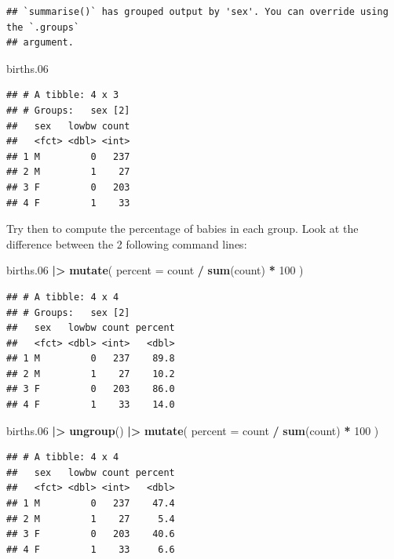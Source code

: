 \documentclass[
]{book}
\newenvironment{Shaded}{\begin{snugshade}}{\end{snugshade}}
\newcommand{\AttributeTok}[1]{\textcolor[rgb]{0.13,0.29,0.53}{#1}}
\newcommand{\DecValTok}[1]{\textcolor[rgb]{0.00,0.00,0.81}{#1}}
\newcommand{\FloatTok}[1]{\textcolor[rgb]{0.00,0.00,0.81}{#1}}
\newcommand{\FunctionTok}[1]{\textcolor[rgb]{0.13,0.29,0.53}{\textbf{#1}}}
\newcommand{\NormalTok}[1]{#1}
\newcommand{\SpecialCharTok}[1]{\textcolor[rgb]{0.81,0.36,0.00}{\textbf{#1}}}
\begin{document}
\begin{verbatim}
## `summarise()` has grouped output by 'sex'. You can override using the `.groups`
## argument.
\end{verbatim}

\begin{Shaded}
\begin{Highlighting}[]
\NormalTok{births}\FloatTok{.06}
\end{Highlighting}
\end{Shaded}

\begin{verbatim}
## # A tibble: 4 x 3
## # Groups:   sex [2]
##   sex   lowbw count
##   <fct> <dbl> <int>
## 1 M         0   237
## 2 M         1    27
## 3 F         0   203
## 4 F         1    33
\end{verbatim}

Try then to compute the percentage of babies in each group.
Look at the difference between the 2 following command lines:

\begin{Shaded}
\begin{Highlighting}[]
\NormalTok{births}\FloatTok{.06} \SpecialCharTok{|\textgreater{}}
  \FunctionTok{mutate}\NormalTok{(}
    \AttributeTok{percent =}\NormalTok{ count }\SpecialCharTok{/} \FunctionTok{sum}\NormalTok{(count) }\SpecialCharTok{*} \DecValTok{100}
\NormalTok{  )}
\end{Highlighting}
\end{Shaded}

\begin{verbatim}
## # A tibble: 4 x 4
## # Groups:   sex [2]
##   sex   lowbw count percent
##   <fct> <dbl> <int>   <dbl>
## 1 M         0   237    89.8
## 2 M         1    27    10.2
## 3 F         0   203    86.0
## 4 F         1    33    14.0
\end{verbatim}

\begin{Shaded}
\begin{Highlighting}[]
\NormalTok{births}\FloatTok{.06} \SpecialCharTok{|\textgreater{}}
  \FunctionTok{ungroup}\NormalTok{() }\SpecialCharTok{|\textgreater{}}
  \FunctionTok{mutate}\NormalTok{(}
    \AttributeTok{percent =}\NormalTok{ count }\SpecialCharTok{/} \FunctionTok{sum}\NormalTok{(count) }\SpecialCharTok{*} \DecValTok{100}
\NormalTok{  )}
\end{Highlighting}
\end{Shaded}

\begin{verbatim}
## # A tibble: 4 x 4
##   sex   lowbw count percent
##   <fct> <dbl> <int>   <dbl>
## 1 M         0   237    47.4
## 2 M         1    27     5.4
## 3 F         0   203    40.6
## 4 F         1    33     6.6
\end{verbatim}
\end{document}
